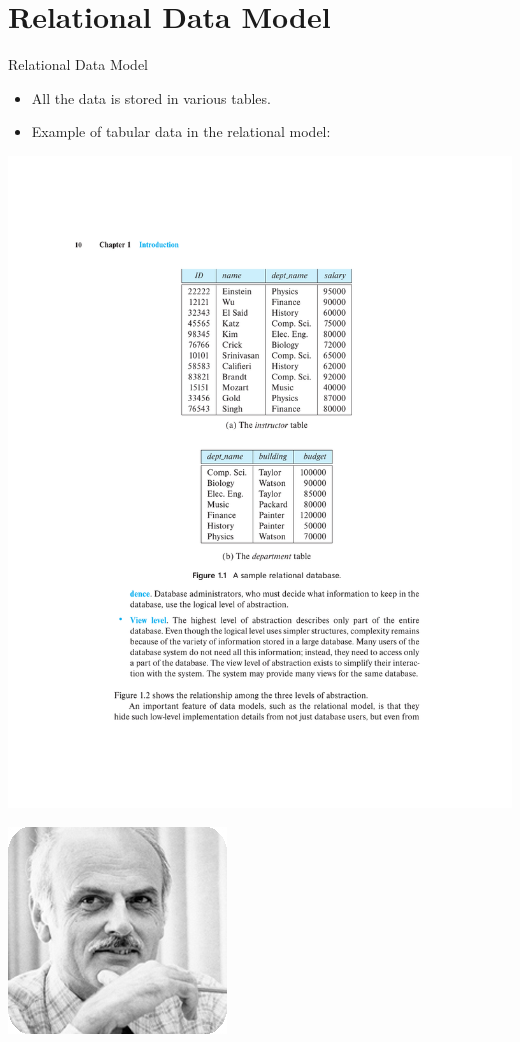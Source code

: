 \documentclass{beamer}
\begin{document}
\section{Relational Data Model}
\begin{frame}{Relational Data Model}
    \begin{itemize}
        \item All the data is stored in various tables.
        \item Example of tabular data in the relational model:
    \end{itemize}
    \begin{minipage}{.5\textwidth}
        \centering
        \includegraphics[width=\textwidth, trim={7cm 16cm 6.5cm 4cm}, clip]{figures/db}
    \end{minipage}%
    \begin{minipage}{0.5\textwidth}
        \centering
        \includegraphics[width=0.5\linewidth]{figures/codd}\\

\end{minipage}
\end{frame}
\end{document}
